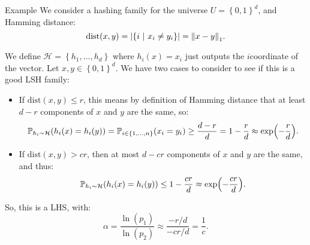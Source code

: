 \documentclass[a4paper]{article}
\begin{document}
\begin{parag}{Example}
    We consider a hashing family for the universe $U = \left\{0, 1\right\}^d$, and Hamming distance: 
    \[\text{dist}\left(x, y\right) = \left|\left\{i \suchthat x_i \neq y_i\right\}\right| = \left\|x - y\right\|_1.\]
    
    We define $\mathcal{H} = \left\{h_1, \ldots, h_d\right\}$ where $h_i\left(x\right) = x_i$ just outputs the $i$\Th coordinate of the vector. Let $x, y \in \left\{0, 1\right\}^d$. We have two cases to consider to see if this is a good LSH family:
    \begin{itemize}[left=0pt]
        \item If $\text{dist}\left(x, y\right) \leq r$, this means by definition of Hamming distance that at least $d - r$ components of $x$ and $y$ are the same, so: 
        \[\prob_{h_i \followsdistr \mathcal{H}}\left(h_i\left(x\right) = h_i\left(y\right)\right) = \prob_{i \in \left\{1, \ldots, n\right\}}\left(x_i = y_i\right) \geq \frac{d-r}{d} = 1 - \frac{r}{d} \approx \exp\left(-\frac{r}{d}\right).\]
        \item If $\text{dist}\left(x, y\right) > cr$, then at most $d - cr$ components of $x$ and $y$ are the same, and thus: 
        \[\prob_{h_i \followsdistr \mathcal{H}}\left(h_i\left(x\right) = h_i\left(y\right)\right) \leq 1 - \frac{cr}{d} \approx \exp\left(-\frac{cr}{d}\right).\]
    \end{itemize}

    So, this is a LHS, with: 
    \[\alpha = \frac{\ln\left(p_1\right)}{\ln\left(p_2\right)} \approx \frac{-r/d}{-cr/d} = \frac{1}{c}.\]
   \end{parag}
\end{document}
